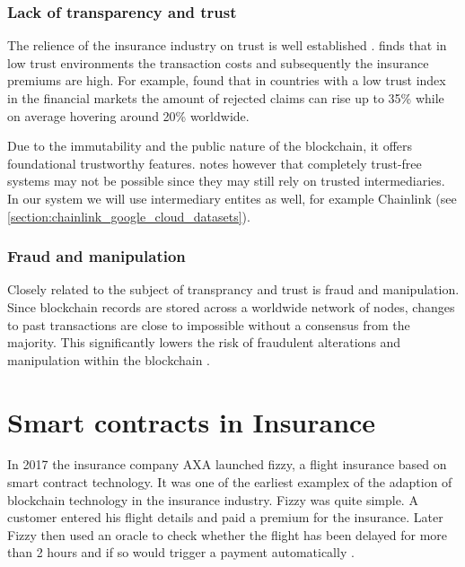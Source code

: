 \subsubsection{Lack of transparency and trust}
 
 The relience of the insurance industry on trust is well established \autocite{courbage2021trust}. \autocite{guiso2012trust} finds that in low trust environments the transaction costs and subsequently the insurance premiums are high. For example, \autocite{gennaioli2022trust} found that in countries with a low trust index in the financial markets the amount of rejected claims can rise up to 35\% while on average hovering around 20\% worldwide. 
 
 Due to the immutability and the public nature of the blockchain, it offers foundational trustworthy features. \autocite{hawlitschek2018limits} notes however that completely trust-free systems may not be possible since they may still rely on trusted intermediaries. In our system we will use intermediary entites as well, for example Chainlink (see \cref{section:chainlink_google_cloud_datasets}).
 
 \subsubsection{Fraud and manipulation}
 
 Closely related to the subject of transprancy and trust is fraud and manipulation. Since blockchain records are stored across a worldwide network of nodes, changes to past transactions are close to impossible without a consensus from the majority. This significantly lowers the risk of fraudulent alterations and manipulation within the blockchain \autocite{eigelshoven2021cryptocurrency}. 
 
 \section{Smart contracts in Insurance}\label{section:smart_contracts_insurance}
 
 In 2017 the insurance company AXA launched fizzy, a flight insurance based on smart contract technology. It was one of the earliest examplex of the adaption of blockchain technology in the insurance industry. Fizzy was quite simple. A customer entered his flight details and paid a premium for the insurance. Later Fizzy then used an oracle to check whether the flight has been delayed for more than 2 hours and if so would trigger a payment automatically \autocite{hoffmann2021double}.
 
